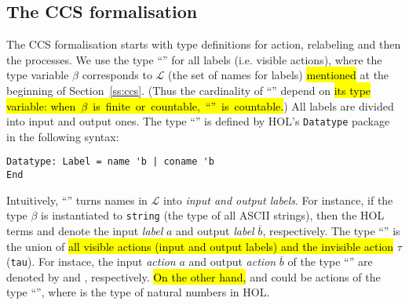 
\subsection{The CCS formalisation}
\label{ss:formalCCS}

The CCS formalisation starts with type definitions for action,
relabeling and then the  processes. We use the type ``''
for all labels (i.e. visible actions), where the type variable $\beta$ corresponds
to $\mathscr{L}$ (the set of names for labels) \hl{mentioned} at the beginning
of Section~\ref{ss:ccs}. (Thus the
cardinality of ``'' depend on \hl{its type variable:
\mbox{when $\beta$ is finite or countable, ``'' is countable.}})
All labels are divided into input and output ones.
The type ``'' is defined by HOL's \texttt{Datatype} package in the
following syntax:
\begin{lstlisting}
Datatype: Label = name 'b | coname 'b
End
\end{lstlisting}
Intuitively, ``'' turns names in $\mathscr{L}$ into \emph{input and output labels}.
For instance, if the type $\beta$ is instantiated to \texttt{string}
(the type of all ASCII strings), then the HOL terms  and
 denote the input \emph{label} $a$ and output
\emph{label} $\overline{b}$, respectively.
The type ``'' is the
union of \hl{all visible actions (input and output labels) and the invisible action} $\tau$
(\texttt{tau}). For instace, the input \emph{action} $a$ and output
\emph{action} $\overline{b}$ of the type ``''
are denoted by  and , respectively. \hl{On the
other hand,}  and  could be actions of the type ``'', where
 is the type of natural numbers in HOL.

